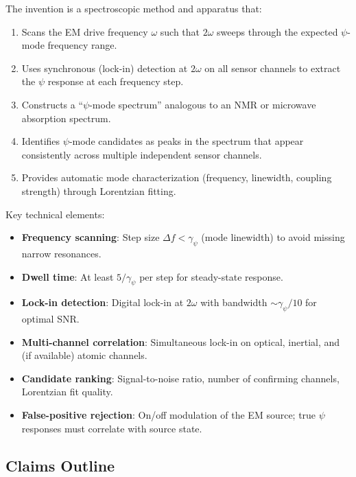 \documentclass[11pt,a4paper]{article}
\begin{document}
The invention is a spectroscopic method and apparatus that:

\begin{enumerate}[nosep]
\item Scans the EM drive frequency $\omega$ such that $2\omega$
sweeps through the expected $\psi$-mode frequency range.

\item Uses synchronous (lock-in) detection at $2\omega$ on all
sensor channels to extract the $\psi$ response at each
frequency step.

\item Constructs a ``$\psi$-mode spectrum'' analogous to an NMR
or microwave absorption spectrum.

\item Identifies $\psi$-mode candidates as peaks in the spectrum
that appear consistently across multiple independent sensor
channels.

\item Provides automatic mode characterization (frequency,
linewidth, coupling strength) through Lorentzian fitting.
\end{enumerate}

Key technical elements:
\begin{itemize}[nosep]
\item \textbf{Frequency scanning}: Step size $\Delta f < \gamma_\psi$
(mode linewidth) to avoid missing narrow resonances.
\item \textbf{Dwell time}: At least $5/\gamma_\psi$ per step
for steady-state response.
\item \textbf{Lock-in detection}: Digital lock-in at $2\omega$
with bandwidth $\sim \gamma_\psi/10$ for optimal SNR.
\item \textbf{Multi-channel correlation}: Simultaneous lock-in
on optical, inertial, and (if available) atomic channels.
\item \textbf{Candidate ranking}: Signal-to-noise ratio, number
of confirming channels, Lorentzian fit quality.
\item \textbf{False-positive rejection}: On/off modulation of
the EM source; true $\psi$ responses must correlate with
source state.
\end{itemize}

\subsection{Claims Outline}
\end{document}
